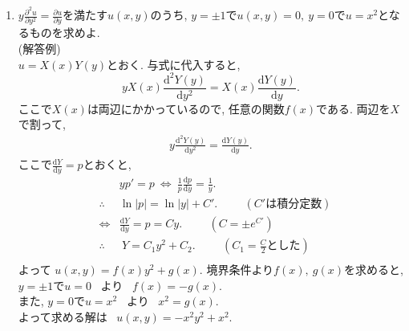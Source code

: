 \documentclass[11pt]{jsarticle}
\begin{document}
\begin{enumerate}
\newpage
\item
$\displaystyle{y\frac{\partial^2u}{\partial y^2}=
\frac{\partial u}{\partial y}}$を満たす$u(x,y)$のうち,
$y=\pm1$で$u(x,y)=0,\ y=0$で$u=x^2$となるものを求めよ.\\
(解答例)\\
$u=X(x)Y(y)$とおく. 与式に代入すると,
\\
\[
yX(x)\frac{\mathrm{d}^2Y(y)}{\mathrm{d}y^2}=
X(x)\frac{\mathrm{d}Y(y)}{\mathrm{d}y}.
\]
ここで$X(x)$は両辺にかかっているので, 任意の関数$f(x)$である.
両辺を$X$で割って,
%
\begin{eqnarray*}
y\frac{\mathrm{d}^2Y(y)}{\mathrm{d}y^2} = \frac{\mathrm{d}Y(y)}{\mathrm{d}y}.
\end{eqnarray*}
%
ここで$\displaystyle{\frac{\mathrm{d}Y}{\mathrm{d}y}=p}$とおくと,
\begin{eqnarray*}
&& yp' = p \ \Leftrightarrow \
\frac1p\frac{\mathrm{d}p}{\mathrm{d}y} = \frac1y.  \\[5pt]
&\therefore& \ln|p| = \ln|y|+C'. \hspace{1cm} (C'は積分定数) \\[7pt]
&\Leftrightarrow& \frac{\mathrm{d}Y}{\mathrm{d}y}=p = Cy. \hspace{1cm}
\left(C=\pm e^{C'}\right) \\[3pt]
&\therefore& \ Y = C_1y^2+C_2. \hspace{1cm} \left(C_1=\frac C2 とした \right)\\
\end{eqnarray*}
よって $u(x,y)=f(x)y^2+g(x)$.
境界条件より$f(x),\ g(x)$を求めると,
 \\[5pt]
$y=\pm1 で u=0$ \ より \ $f(x)=-g(x)$.\\[5pt]
また, $y=0 で u=x^2$ \ より \ $x^2=g(x)$.\\[5pt]
よって求める解は \ $u(x,y)=-x^2y^2+x^2$.



\end{enumerate}
\end{document}
